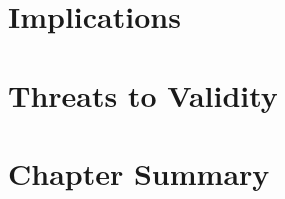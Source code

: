 \section{Implications}
\label{sec:Study2_Implications_And_Discussions}


\section{Threats to Validity}
\label{sec:Study2_Limitations_And_Threats}


\section{Chapter Summary}
\label{sec:Study2_Conclusion}
